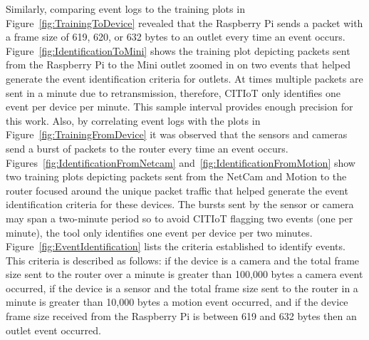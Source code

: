 \documentclass[12pt,letterpaper,oneside]{book}
\begin{document}
			\figClassificationToNetcam
			\figClassificationToMotion
			\figClassificationToSwitch
			\figDeviceClassification
			
			Similarly, comparing event logs to the training plots in Figure~\ref{fig:TrainingToDevice} revealed that the Raspberry Pi sends a packet with a frame size of 619, 620, or 632 bytes to an outlet every time an event occurs. Figure~\ref{fig:IdentificationToMini} shows the training plot depicting packets sent from the Raspberry Pi to the Mini outlet zoomed in on two events that helped generate the event identification criteria for outlets. At times multiple packets are sent in a minute due to retransmission, therefore, \ac{CITIoT} only identifies one event per device per minute. This sample interval provides enough precision for this work. Also, by correlating event logs with the plots in Figure~\ref{fig:TrainingFromDevice} it was observed that the sensors and cameras send a burst of packets to the router every time an event occurs. Figures~\ref{fig:IdentificationFromNetcam} and~\ref{fig:IdentificationFromMotion} show two training plots depicting packets sent from the NetCam and Motion to the router focused around the unique packet traffic that helped generate the event identification criteria for these devices. The bursts sent by the sensor or camera may span a two-minute period so to avoid \ac{CITIoT} flagging two events (one per minute), the tool only identifies one event per device per two minutes. Figure~\ref{fig:EventIdentification} lists the criteria established to identify events. This criteria is described as follows: if the device is a camera and the total frame size sent to the router over a minute is greater than 100,000 bytes a camera event occurred, if the device is a sensor and the total frame size sent to the router in a minute is greater than 10,000 bytes a motion event occurred, and if the device frame size received from the Raspberry Pi is between 619 and 632 bytes then an outlet event occurred.
			
			\figIdentificationToMini
			\figIdentificationFromNetcam
			\figIdentificationFromNetcamCum
			\figIdentificationFromMotion
			\figIdentificationFromMotionCum
			\figEventIdentification
			
\end{document}
